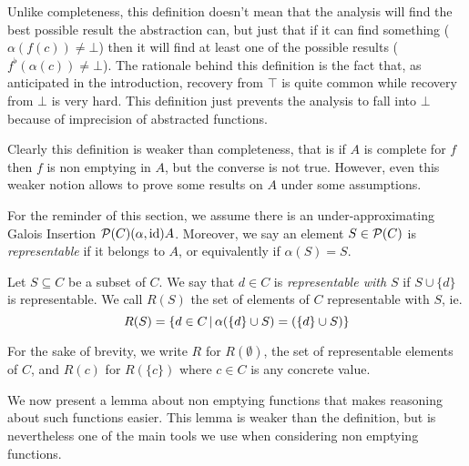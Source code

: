 Unlike completeness, this definition doesn't mean that the analysis will find the best possible result the abstraction can, but just that if it can find something ($\alpha(f(c)) \neq \bot$) then it will find at least one of the possible results ($f^{\flat}(\alpha(c)) \neq \bot$).
The rationale behind this definition is the fact that, as anticipated in the introduction, recovery from $\top$ is quite common while recovery from $\bot$ is very hard. This definition just prevents the analysis to fall into $\bot$ because of imprecision of abstracted functions.

Clearly this definition is weaker than completeness, that is if $A$ is complete for $f$ then $f$ is non emptying in $A$, but the converse is not true.
However, even this weaker notion allows to prove some results on $A$ under some assumptions.

For the reminder of this section, we assume there is an under-approximating Galois Insertion $\mathcal{P}(C) (\alpha, \text{id}) A$. Moreover, we say an element $S \in \mathcal{P}(C)$ is \textit{representable} if it belongs to $A$, or equivalently if $\alpha(S) = S$.

\begin{definition}\label{ch3:def:repr-with-set}
	Let $S \subseteq C$ be a subset of $C$. We say that $d \in C$ is \textit{representable with $S$} if $S \cup \{ d \}$ is representable. We call $R(S)$ the set of elements of $C$ representable with $S$, ie.
	\[
	R(S) = \{ d \in C \,\vert\, \alpha(\{ d \} \cup S) = (\{ d \} \cup S) \}
	\]
\end{definition}
For the sake of brevity, we write $R$ for $R(\emptyset)$, the set of representable elements of $C$, and $R(c)$ for $R(\{ c \})$ where $c \in C$ is any concrete value.

We now present a lemma about non emptying functions that makes reasoning about such functions easier. This lemma is weaker than the definition, but is nevertheless one of the main tools we use when considering non emptying functions.

